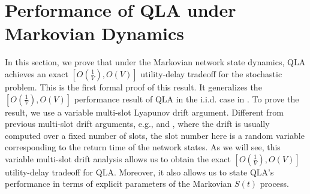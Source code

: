 \documentclass[journal]{IEEEtran}
\newcommand{\bv}[1]{{\boldsymbol{#1} }}
\begin{document}





\section{Performance of QLA under Markovian Dynamics}\label{section:qla-performance}
In this section, we prove that under the Markovian network state dynamics, QLA achieves an exact $[O(\frac{1}{V}), O(V)]$ utility-delay tradeoff for the stochastic problem. This is the first formal proof of this result. It generalizes the $[O(\frac{1}{V}), O(V)]$ performance result of QLA in the i.i.d. case in \cite{neelynowbook}. 
To prove the result, we use a variable multi-slot Lyapunov drift argument. Different from previous multi-slot drift arguments, e.g., \cite{neelypowerjsac} and \cite{neely_queuestability10}, where the drift is usually computed over a fixed number of slots, the slot number here is a random variable corresponding to the return time of the network states. As we will see, this variable multi-slot drift analysis allows us to obtain the exact $[O(\frac{1}{V}), O(V)]$ utility-delay tradeoff for QLA. Moreover, it also allows us to state QLA's performance in terms of explicit parameters of the Markovian $S(t)$ process. 
\end{document}
